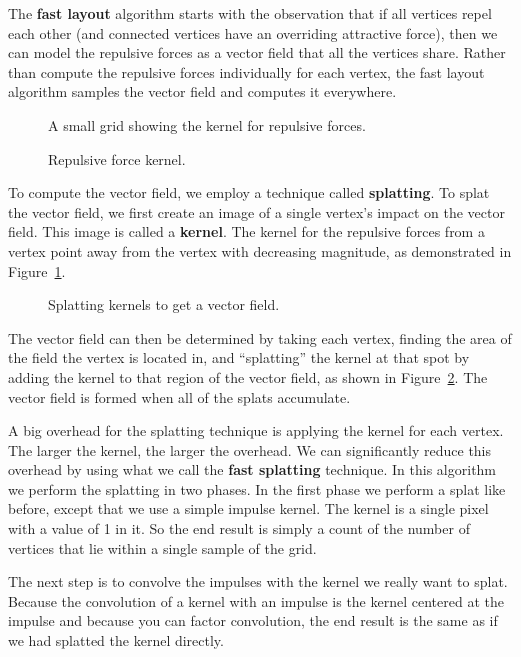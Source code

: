\documentclass[pdf,12pt,report,strict]{SANDreport}
\newcommand*{\keyterm}[1]{\textbf{#1}}
\newcommand*{\keytermidx}[1]{\keyterm{#1}\index{#1}}
\begin{document}
The \keyterm{fast layout} algorithm starts with the observation that if all
vertices repel each other (and connected vertices have an overriding
attractive force), then we can model the repulsive forces as a vector field
that all the vertices share.  Rather than compute the repulsive forces
individually for each vertex, the fast layout algorithm samples the vector
field and computes it everywhere.

\begin{figure}
  \centering
  A small grid showing the kernel for repulsive forces.
  \caption{Repulsive force kernel.}
  \label{fig:SplatKernel}
\end{figure}

To compute the vector field, we employ a technique called
\keytermidx{splatting}.  To splat the vector field, we first create an
image of a single vertex's impact on the vector field.  This image is
called a \keytermidx{kernel}.  The kernel for the repulsive forces from a
vertex point away from the vertex with decreasing magnitude, as
demonstrated in Figure~\ref{fig:SplatKernel}.

\begin{figure}
  \centering
    
  \caption{Splatting kernels to get a vector field.}
  \label{fig:Splatting}
\end{figure}

The vector field can then be determined by taking each vertex, finding the
area of the field the vertex is located in, and ``splatting'' the kernel at
that spot by adding the kernel to that region of the vector field, as shown
in Figure~\ref{fig:Splatting}.  The vector field is formed when all of the
splats accumulate.


A big overhead for the splatting technique is applying the kernel for each
vertex.  The larger the kernel, the larger the overhead.  We can
significantly reduce this overhead by using what we call the \keyterm{fast
splatting} technique.  In this algorithm we perform
the splatting in two phases.  In the first phase we perform a splat like
before, except that we use a simple impulse kernel.  The kernel is a single
pixel with a value of 1 in it.  So the end result is simply a count of the
number of vertices that lie within a single sample of the grid.

The next step is to convolve the impulses with the kernel we really want to
splat.  Because the convolution of a kernel with an impulse is the kernel
centered at the impulse and because you can factor convolution, the end
result is the same as if we had splatted the kernel directly.
\end{document}
